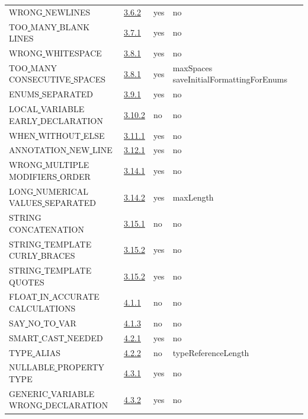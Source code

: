 \begin{longtable}{ |l|p{0.8cm}|p{0.8cm}| p{3cm} | }
WRONG\underline{ }NEWLINES & \hyperref[sec:3.6.2]{ 3.6.2} &  yes  &   no  \\
TOO\underline{ }MANY\underline{ }BLANK\underline{ }LINES & \hyperref[sec:3.7.1]{ 3.7.1} &  yes  &   no  \\
WRONG\underline{ }WHITESPACE & \hyperref[sec:3.8.1]{ 3.8.1} &  yes  &   no  \\
TOO\underline{ }MANY\underline{ }CONSECUTIVE\underline{ }SPACES & \hyperref[sec:3.8.1]{ 3.8.1} &  yes  &   maxSpaces saveInitialFormattingForEnums  \\
ENUMS\underline{ }SEPARATED & \hyperref[sec:3.9.1]{ 3.9.1} &  yes  &   no  \\
LOCAL\underline{ }VARIABLE\underline{ }EARLY\underline{ }DECLARATION & \hyperref[sec:3.10.2]{ 3.10.2} &  no  &   no  \\
WHEN\underline{ }WITHOUT\underline{ }ELSE & \hyperref[sec:3.11.1]{ 3.11.1} &  yes  &   no  \\
ANNOTATION\underline{ }NEW\underline{ }LINE & \hyperref[sec:3.12.1]{ 3.12.1} &  yes  &   no  \\
WRONG\underline{ }MULTIPLE\underline{ }MODIFIERS\underline{ }ORDER & \hyperref[sec:3.14.1]{ 3.14.1} &  yes  &   no  \\
LONG\underline{ }NUMERICAL\underline{ }VALUES\underline{ }SEPARATED & \hyperref[sec:3.14.2]{ 3.14.2} &  yes  &   maxLength                  \\
STRING\underline{ }CONCATENATION & \hyperref[sec:3.15.1]{ 3.15.1} &  no  &   no  \\
STRING\underline{ }TEMPLATE\underline{ }CURLY\underline{ }BRACES & \hyperref[sec:3.15.2]{ 3.15.2} &  yes  &   no  \\
STRING\underline{ }TEMPLATE\underline{ }QUOTES & \hyperref[sec:3.15.2]{ 3.15.2} &  yes  &   no  \\
FLOAT\underline{ }IN\underline{ }ACCURATE\underline{ }CALCULATIONS & \hyperref[sec:4.1.1]{ 4.1.1} &  no  &   no  \\
SAY\underline{ }NO\underline{ }TO\underline{ }VAR & \hyperref[sec:4.1.3]{ 4.1.3} &  no  &   no  \\
SMART\underline{ }CAST\underline{ }NEEDED & \hyperref[sec:4.2.1]{ 4.2.1} &  yes  &   no  \\
TYPE\underline{ }ALIAS & \hyperref[sec:4.2.2]{ 4.2.2} &  no  &   typeReferenceLength        \\
NULLABLE\underline{ }PROPERTY\underline{ }TYPE & \hyperref[sec:4.3.1]{ 4.3.1} &  yes  &   no  \\
GENERIC\underline{ }VARIABLE\underline{ }WRONG\underline{ }DECLARATION & \hyperref[sec:4.3.2]{ 4.3.2} &  yes  &   no  \\

\end{longtable}
